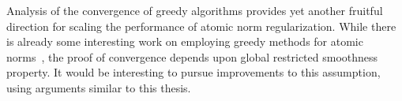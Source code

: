 Analysis of the convergence of greedy algorithms provides yet another fruitful
direction for scaling the performance of atomic norm regularization. While there
is already some interesting work on employing greedy methods for atomic
norms~\cite{tewari2011greedy,raogreedy}, the proof of convergence depends upon
global restricted smoothness property. It would be interesting to pursue
improvements to this assumption, using arguments similar to this thesis.

% 
% 




